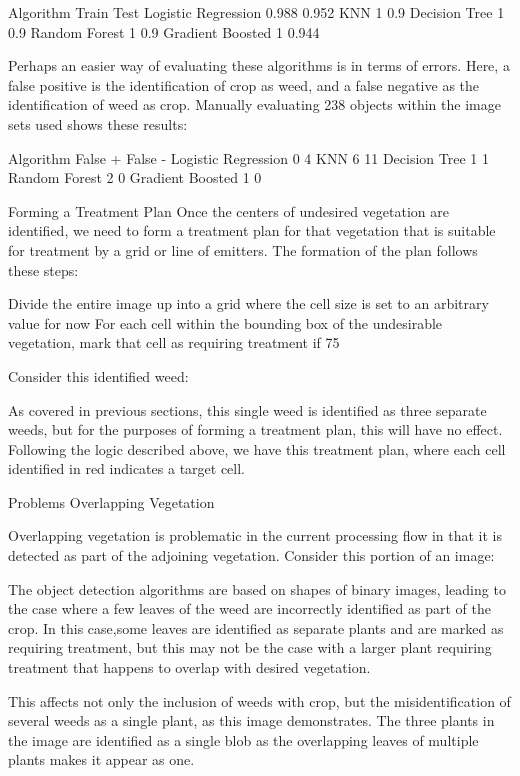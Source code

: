\documentclass[letterpaper]{article}
\begin{document}
Algorithm
Train
Test
Logistic Regression
0.988
0.952
KNN
1
0.9
Decision Tree
1
0.9
Random Forest
1
0.9
Gradient Boosted
1
0.944


Perhaps an easier way of evaluating these algorithms is in terms of errors.  Here, a false positive is the identification of crop as weed, and a false negative as the identification of weed as crop.   Manually evaluating 238 objects within the image sets used shows these results:


Algorithm
False +
False -
Logistic Regression
0
4
KNN
6
11
Decision Tree
1
1
Random Forest
2
0
Gradient Boosted
1
0


Forming a Treatment Plan
Once the centers of undesired vegetation are identified, we need to form a treatment plan for that vegetation that is suitable for treatment by a grid or line of emitters. The formation of the plan follows these steps:

Divide the entire image up into a grid where the cell size is set to an arbitrary value for now
For each cell within the bounding box of the undesirable vegetation, mark that cell as requiring treatment if 75%

Consider this identified weed:



As covered in previous sections, this single weed is identified as three separate weeds, but for the purposes of forming a treatment plan, this will have no effect. Following the logic described above, we have this treatment plan, where each cell identified in red indicates a target cell.




Problems
Overlapping Vegetation

Overlapping vegetation is problematic in the current processing flow in that it is detected as part of the adjoining vegetation.  Consider this portion of an image:



The object detection algorithms are based on shapes of binary images, leading to the case where a few leaves of the weed are incorrectly identified as part of the crop. In this case,some leaves are identified as separate plants and are marked as requiring treatment, but this may not be the case with a larger plant requiring treatment that happens to overlap with desired vegetation.



This affects not only the inclusion of weeds with crop, but the misidentification of several weeds as a single plant, as this image demonstrates.  The three plants in the image are identified as a single blob as the overlapping leaves of multiple plants makes it appear as one.
\end{document}
